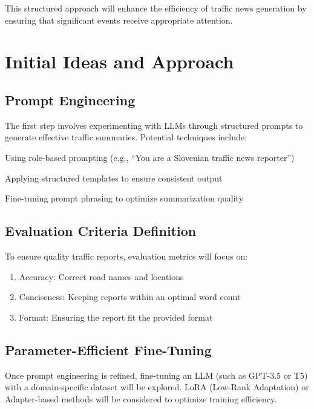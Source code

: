 \documentclass[fleqn,moreauthors,10pt]{ds_report}
\begin{document}
This structured approach will enhance the efficiency of traffic news generation by ensuring that significant events receive appropriate attention.

\section*{Initial Ideas and Approach}

\subsection*{Prompt Engineering}

The first step involves experimenting with LLMs through structured prompts to generate effective traffic summaries. Potential techniques include:

Using role-based prompting (e.g., “You are a Slovenian traffic news reporter”)

Applying structured templates to ensure consistent output

Fine-tuning prompt phrasing to optimize summarization quality

\subsection*{Evaluation Criteria Definition}

To ensure quality traffic reports, evaluation metrics will focus on:

\begin{enumerate}[noitemsep] 
	\item Accuracy: Correct road names and locations
    
	\item Conciseness: Keeping reports within an optimal word count

        \item Format: Ensuring the report fit the provided format
\end{enumerate}


\subsection*{Parameter-Efficient Fine-Tuning}

Once prompt engineering is refined, fine-tuning an LLM (such as GPT-3.5 or T5) with a domain-specific dataset will be explored. LoRA (Low-Rank Adaptation) or Adapter-based methods will be considered to optimize training efficiency.
\end{document}
